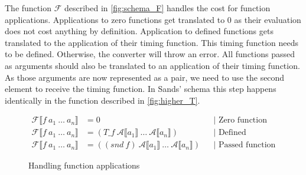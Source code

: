 The function $\mathcal{F}$ described in \autoref{fig:schema_F} handles the cost for function applications.
Applications to zero functions get translated to $0$ as their evaluation does not cost anything by definition.
Application to defined functions gets translated to the application of their timing function.
This timing function needs to be defined. Otherwise, the converter will throw an error.
All functions passed as arguments should also be translated to an application of their timing function.
As those arguments are now represented as a pair, we need to use the second element to receive the timing function.
In Sands' schema this step happens identically in the function described in \autoref{fig:higher_T}.
\begin{figure}
\begin{align*}
  \mathcal{F}\llbracket f\ a_{1}\ \dots\ a_{n}\rrbracket &= 0 &&\text{| Zero function}\\
  \mathcal{F}\llbracket f\ a_{1}\ \dots\ a_{n}\rrbracket &= (T\_f\ \mathcal{A}\llbracket a_{1}\rrbracket\ \dots\ \mathcal{A}\llbracket a_{n}\rrbracket) &&\text{| Defined function}\\
  \mathcal{F}\llbracket f\ a_{1}\ \dots\ a_{n}\rrbracket &= ((snd\ f)\ \mathcal{A}\llbracket a_{1}\rrbracket\ \dots\ \mathcal{A}\llbracket a_{n}\rrbracket) &&\text{| Passed function}
\end{align*}
\caption{Handling function applications}
\label{fig:schema_F}
\end{figure}

